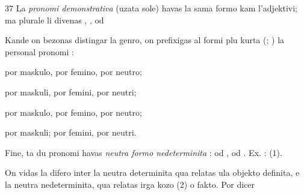 \begin{VUpage}[41]{37}
La \textit{pronomi demonstrativa} (uzata sole) havas la sama\nl
formo kam l'adjektivi; ma plurale li divenas , , od\nl
{}

Kande on bezonas distingar la genro, on prefixigas al\nl
formi plu kurta (; ) la personal pronomi  :

\VUblanc{3.87pt}%
 por maskulo,  por femino,  por neutro;

 por maskuli,  por femini,  por neutri;

 por maskulo,  por femino,  por neutro;

 por maskuli;  por femini,  por neutri.

\VUblanc{3.80pt}%
Fine, ta du pronomi havas \textit{neutra formo nedeterminita} :\nl
{} od ,  od . Ex. : \nl
{}\nl
{} (1).

On vidas la difero inter la neutra determinita \nl
qua relatas ula objekto definita, e la neutra \nl
nedeterminita, qua relatas irga kozo (2) o fakto. Por dicer\cc
\end{VUpage}


